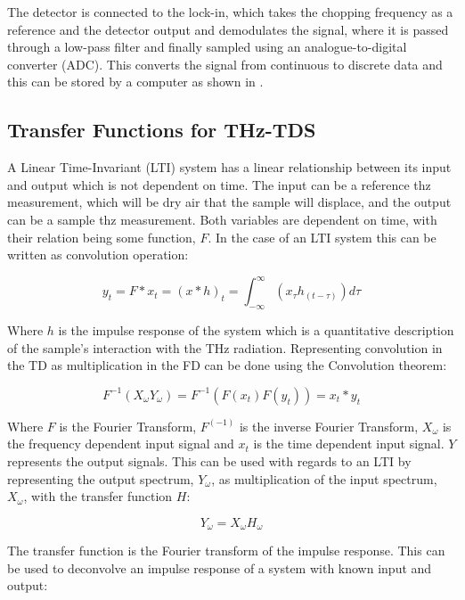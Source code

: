 The detector is connected to the lock-in, which takes the chopping frequency as a reference and the detector output and demodulates the signal, where it is passed through a low-pass filter and finally sampled using an analogue-to-digital converter (ADC). This converts the signal from continuous to discrete data and this can be stored by a computer as shown in .

\subsection{Transfer Functions for THz-TDS}
A Linear Time-Invariant (LTI) system has a linear relationship between its input and output which is not dependent on time. The input can be a reference \acrshort{thz} measurement, which will be dry air that the sample will displace, and the output can be a sample \acrshort{thz} measurement. Both variables are dependent on time, with their relation being some function, \(F\). In the case of an LTI system this can be written as convolution operation: 

\begin{equation}
y_t = F * x_t = (x * h)_t = \int_{-\infty}^{\infty} (x_{\tau} h_{(t-\tau)}) d\tau
\end{equation}

Where \(h\) is the impulse response of the system which is a quantitative description of the sample’s interaction with the THz radiation. Representing convolution in the TD as multiplication in the FD can be done using the Convolution theorem: 

\begin{equation}
F^{-1} (X_{\omega}Y_{\omega}) = F^{-1}(F(x_t)F(y_t)) = x_t * y_t
\end{equation}

Where \(F\) is the Fourier Transform, \(F^(-1)\) is the inverse Fourier Transform, \(X_{\omega}\) is the frequency dependent input signal and \(x_t\) is the time dependent input signal. \(Y\) represents the output signals.  This can be used with regards to an LTI by representing the output spectrum, \(Y_{\omega}\), as multiplication of the input spectrum, \(X_{\omega}\), with the transfer function \(H\): 

\begin{equation}
Y_{\omega} = X_{\omega} H_{\omega}
\end{equation}

The transfer function is the Fourier transform of the impulse response. This can be used to deconvolve an impulse response of a system with known input and output:

